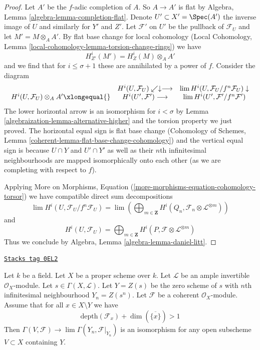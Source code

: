 \begin{proof}
\medskip\noindent
Let $A'$ be the $f$-adic completion of $A$. So $A \to A'$ is flat by
Algebra, Lemma \ref{algebra-lemma-completion-flat}.
Denote $U' \subset X' = \Spec(A')$ the inverse image of
$U$ and similarly for $Y'$ and $Z'$. Let $\mathcal{F}'$
on $U'$ be the pullback of $\mathcal{F}_U$ and let
$M' = M \otimes_A A'$.
By flat base change for local cohomology
(Local Cohomology, Lemma \ref{local-cohomology-lemma-torsion-change-rings})
we have
$$
H^i_{Z'}(M') = H^i_Z(M) \otimes_A A'
$$
and we find that for $i \leq \sigma + 1$
these are annihilated by a power of $f$. Consider the diagram
$$
\begin{array}{ccc} & H^i(U, \mathcal{F}_U) \swarrow\downarrow\longrightarrow & \lim H^i(U, \mathcal{F}_U/f^n\mathcal{F}_U) \downarrow \\ H^i(U, \mathcal{F}_U) \otimes_A A' \xlongequal{} & H^i(U', \mathcal{F}') \longrightarrow & \lim H^i(U', \mathcal{F}'/f^n\mathcal{F}')\end{array}
$$
The lower horizontal arrow is an isomorphism for $i < \sigma$ by
Lemma \ref{algebraization-lemma-alternative-higher} and the torsion
property we just proved. The horizontal equal sign is flat base change
(Cohomology of Schemes, Lemma \ref{coherent-lemma-flat-base-change-cohomology})
and the vertical equal sign is because $U \cap Y$ and $U' \cap Y'$
as well as their $n$th infinitesimal neighbourhoods
are mapped isomorphically onto each other (as we are
completing with respect to $f$).

\medskip\noindent
Applying More on Morphisms, Equation
(\ref{more-morphisms-equation-cohomology-torsor})
we have compatible direct sum decompositions
$$
\lim H^i(U, \mathcal{F}_U/f^n\mathcal{F}_U) =
\lim
\left(
\bigoplus\nolimits_{m \in \mathbf{Z}}
H^i(Q_n, \mathcal{F}_n \otimes \mathcal{L}^{\otimes m})
\right)
$$
and
$$
H^i(U, \mathcal{F}_U) =
\bigoplus\nolimits_{m \in \mathbf{Z}}
H^i(P, \mathcal{F} \otimes \mathcal{L}^{\otimes m})
$$
Thus we conclude by Algebra, Lemma \ref{algebra-lemma-daniel-litt}.
\end{proof}

\begin{lemma}
\label{algebraization-lemma-lefschetz-addendum}
\href{https://stacks.math.columbia.edu/tag/0EL2}{\texttt{Stacks tag 0EL2}}

Let $k$ be a field. Let $X$ be a proper scheme over $k$.
Let $\mathcal{L}$ be an ample invertible $\mathcal{O}_X$-module.
Let $s \in \Gamma(X, \mathcal{L})$. Let $Y = Z(s)$ be the
zero scheme of $s$ with $n$th infinitesimal neighbourhood $Y_n = Z(s^n)$.
Let $\mathcal{F}$ be a coherent $\mathcal{O}_X$-module.
Assume that for all $x \in X \setminus Y$ we have
$$
\text{depth}(\mathcal{F}_x) + \dim(\overline{\{x\}}) > 1
$$
Then $\Gamma(V, \mathcal{F}) \to \lim \Gamma(Y_n, \mathcal{F}|_{Y_n})$
is an isomorphism for any open subscheme $V \subset X$ containing $Y$.
\end{lemma}


